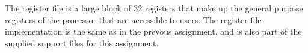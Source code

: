 The register file is a large block of 32 registers that make up the general purpose registers of the processor that are accessible to users.
The register file implementation is the same as in the prevous assignment\cite{assignment-1}, and is also part of the supplied support files for this assignment.
